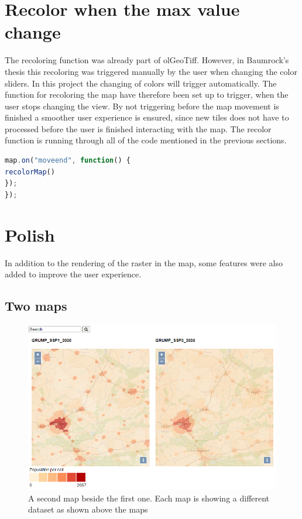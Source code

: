 \section{Recolor when the max value change}\label{RecolorOnChange}

The recoloring function was already part of olGeoTiff. However, in Baumrock's thesis this recoloring was triggered manually by the user when changing the color sliders. In this project the changing of colors will trigger automatically. The function for recoloring the map have therefore been set up to trigger, when the user stops changing the view. By not triggering before the map movement is finished a smoother user experience is ensured, since new tiles does not have to processed before the user is finished interacting with the map. The recolor function is running through all of the code mentioned in the previous sections. 

\begin{lstlisting}[language=JavaScript, caption={The JavaScript in the project}, label= VoresJS,escapechar=|]
map.on("moveend", function() {
recolorMap()
});
});
\end{lstlisting}
\section{Polish}\label{Polish}
In addition to the rendering of the raster in the map, some features were also added to improve the user experience.

\subsection{Two maps}\label{DTTwoMaps}

\begin{figure} [H]
	\centering
	\includegraphics[width=.8\textwidth]{Pictures/Frontpage}
	\caption{A second map beside the first one. Each map is showing a different dataset as shown above the maps}
	\label{DualMaps}
\end{figure}

